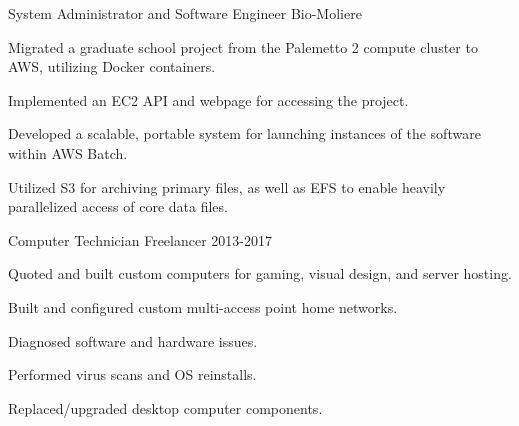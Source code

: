 

\begin{cventries}

  
  \cventry
    {System Administrator and Software Engineer} %
    {Bio-Moliere} %
    {} %
    {} %
    {
      \begin{cvitems} %
        \item {Migrated a graduate school project from the Palemetto 2 compute cluster to AWS, utilizing Docker containers.}
        \item {Implemented an EC2 API and webpage for accessing the project.}
        \item {Developed a scalable, portable system for launching instances of the software within AWS Batch.}
        \item {Utilized S3 for archiving primary files, as well as EFS to enable heavily parallelized access of core data files.}
      \end{cvitems}
    }
    
  \cventry
    {Computer Technician}
    {Freelancer}
    {}
    {2013-2017}
    {
      \begin{cvitems}
        \item{Quoted and built custom computers for gaming, visual design, and server hosting.}%
        \item{Built and configured custom multi-access point home networks.}
        \item{Diagnosed software and hardware issues.}
        \item{Performed virus scans and OS reinstalls.}
        \item{Replaced/upgraded desktop computer components.}
      \end{cvitems}
    }

\end{cventries}
